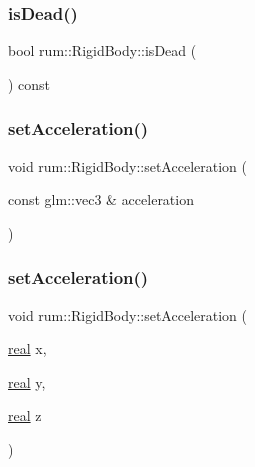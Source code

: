 \mbox{\label{classrum_1_1_rigid_body_a7ee754f4781cc54404e23ef6095d405b}} 
\subsubsection{\texorpdfstring{is\+Dead()}{isDead()}}
{\footnotesize\ttfamily bool rum\+::\+Rigid\+Body\+::is\+Dead (\begin{DoxyParamCaption}{ }\end{DoxyParamCaption}) const}

\mbox{\label{classrum_1_1_rigid_body_a217a8370a7196e29e2e02fa57cde9bb4}} 
\subsubsection{\texorpdfstring{set\+Acceleration()}{setAcceleration()}\hspace{0.1cm}{\footnotesize\ttfamily [1/2]}}
{\footnotesize\ttfamily void rum\+::\+Rigid\+Body\+::set\+Acceleration (\begin{DoxyParamCaption}\item[{const glm\+::vec3 \&}]{acceleration }\end{DoxyParamCaption})}

\mbox{\label{classrum_1_1_rigid_body_a01f23f1951a646cbc534f4d5742f9ec0}} 
\subsubsection{\texorpdfstring{set\+Acceleration()}{setAcceleration()}\hspace{0.1cm}{\footnotesize\ttfamily [2/2]}}
{\footnotesize\ttfamily void rum\+::\+Rigid\+Body\+::set\+Acceleration (\begin{DoxyParamCaption}\item[{\mbox{\hyperlink{namespacerum_a7e8cca23573d5eaead0f138cbaa4862c}{real}}}]{x,  }\item[{\mbox{\hyperlink{namespacerum_a7e8cca23573d5eaead0f138cbaa4862c}{real}}}]{y,  }\item[{\mbox{\hyperlink{namespacerum_a7e8cca23573d5eaead0f138cbaa4862c}{real}}}]{z }\end{DoxyParamCaption})}

